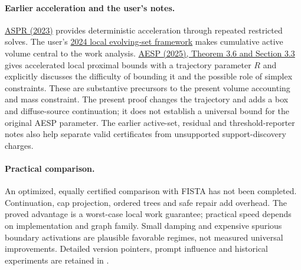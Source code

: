 \paragraph{Earlier acceleration and the user's notes.}
\href{https://proceedings.mlr.press/v195/martinez-rubio23b.html}{ASPR (2023)}
provides deterministic acceleration through repeated restricted solves.
The user's \href{https://arxiv.org/abs/2410.15020}{2024 local evolving-set
framework} makes cumulative active volume central to the work analysis.
\href{https://arxiv.org/html/2510.08010}{AESP (2025), Theorem 3.6 and
Section 3.3} gives accelerated local proximal bounds with a trajectory
parameter $R$ and explicitly discusses the difficulty of bounding it and
the possible role of simplex constraints. These are substantive precursors
to the present volume accounting and mass constraint. The present proof
changes the trajectory and adds a box and diffuse-source continuation;
it does not establish a universal bound for the original AESP parameter.
The earlier active-set, residual and threshold-reporter notes also help
separate valid certificates from unsupported support-discovery charges.

\paragraph{Practical comparison.}
An optimized, equally certified comparison with FISTA has not been completed.
Continuation, cap projection, ordered trees and safe repair add overhead.
The proved advantage is a worst-case local work guarantee; practical speed
depends on implementation and graph family. Small damping and expensive
spurious boundary activations are plausible favorable regimes, not measured
universal improvements. Detailed version pointers, prompt influence and
historical experiments are retained in .
